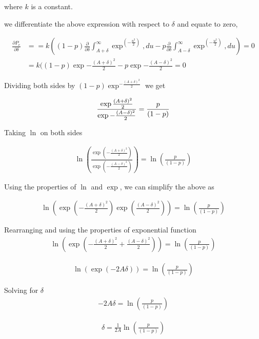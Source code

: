 \documentclass[12pt]{book}
\begin{document}
\begin{enumerate}
where $k$ is a constant.

we differentiate the above expression with respect to $\delta$ and equate to zero,

\begin{align*}
\frac{\partial P_e}{\partial \delta} &== k((1-p)\frac{\partial}{\partial \delta}\int_{A+\delta}^\infty \exp^{\left(-\frac{u^2}{2}\right)} , du - p\frac{\partial}{\partial \delta}\int_{A-\delta}^\infty \exp^{\left(-\frac{u^2}{2}\right)} , du) = 0\\
&=k((1-p)\exp{-\frac{(A+\delta)^2}{2}} - p\exp{-\frac{(A-\delta)^2}{2}} = 0
\end{align*}

Dividing both sides by $(1-p)\exp^{-\frac{(A+\delta)^2}{2}}$ we get

\begin{align*}
\frac{\exp\-\frac{(A+\delta)^2}{2}}{\exp-\frac{(A-\delta)^2}{2}} = \frac{p}{(1-p)}
\end{align*}

Taking $\ln$ on both sides

\begin{align*}
\ln\left(\frac{\exp\left(-\frac{(A+\delta)^2}{2}\right)}{\exp\left(-\frac{(A-\delta)^2}{2}\right)}\right) = \ln\left(\frac{p}{(1-p)}\right)
\end{align*}

Using the properties of $\ln$ and $\exp$, we can simplify the above as

\begin{align*}
\ln\left(\exp\left(-\frac{(A+\delta)^2}{2}\right)\exp\left(\frac{(A-\delta)^2}{2}\right)\right) = \ln\left(\frac{p}{(1-p)}\right)
\end{align*}

Rearranging and using the properties of exponential function
\begin{align*}
\ln\left(\exp\left(-\frac{(A+\delta)^2}{2}+\frac{(A-\delta)^2}{2}\right)\right) = \ln\left(\frac{p}{(1-p)}\right)
\end{align*}

\begin{align*}
\ln\left(\exp\left(-2A\delta\right)\right) = \ln\left(\frac{p}{(1-p)}\right)
\end{align*}

Solving for $\delta$
\begin{align*}
-2A\delta = \ln\left(\frac{p}{(1-p)}\right)
\end{align*}

\begin{align*}
\delta = \frac{1}{2A}\ln\left(\frac{p}{(1-p)}\right)
\end{align*}


\end{enumerate}
\end{document}
